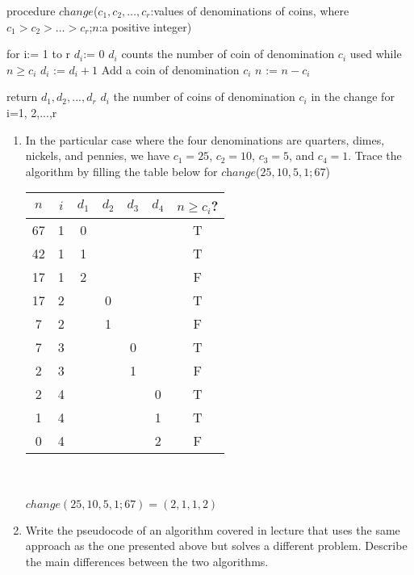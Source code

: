 \documentclass[12pt, oneside]{article}
\begin{document}
\begin{enumerate}
\begin{algorithm}[caption={Change making algorithm in pseudocode}]
procedure $\textit{change}$($c_1,c_2,…,c_r$:values of denominations of coins, where $c_1>c_2>…>c_r$;$n$:a positive integer)

for i:= 1 to r
  $d_i$:= $0$ {$d_i$ counts the  number of coin of denomination $c_i$ used}
  while $n \geq c_i$
    $d_i$ := $d_i + 1$ {Add a coin of denomination $c_i$}
    $n$ := $n - c_i$
    
return $d_1, d_2,...,d_r$ {$d_i$ the number of coins of denomination $c_i$ in the change for i=1, 2,...,r}
\end{algorithm}

\begin{enumerate}
    \item In the particular case where the four denominations are quarters, dimes, nickels, and pennies, we have $c_1 = 25$, $c_2 = 10$, $c_3 = 5$, and $c_4 = 1$. Trace the algorithm by filling the table below for $\textit{change}$($25, 10, 5, 1; 67$)
    
\begin{minipage}{3.2in}
\begin{tabular}{c|c|c|c|c|c|c|}
$n$ & $i$  & $d_1$ & $d_2$ & $d_3$ & $d_4$& $n \geq c_i$?\\
\hline 
 67 & 1 & 0 &  &  & & T\\
 42 & 1 & 1 &  &  & & T\\
 17 & 1 & 2 &  &  & & F\\
 17 & 2 &  & 0 &  & & T\\
 7 & 2 &  & 1 &  & & F \\
 7 & 3 & & & 0 & & T \\
 2 & 3 & & & 1 & & F \\
 2 & 4 & & & & 0 & T \\
 1 & 4 & & & & 1 & T \\
 0 & 4 & & & & 2 & F \\

\end{tabular}\\\\
$change(25, 10, 5, 1; 67) = (2,1,1,2)$
\end{minipage}
    \item Write the pseudocode of an algorithm covered in lecture that uses the same approach as the one presented above but solves a different problem. Describe the main differences between the two algorithms.
\end{enumerate}


\end{enumerate}
\end{document}
